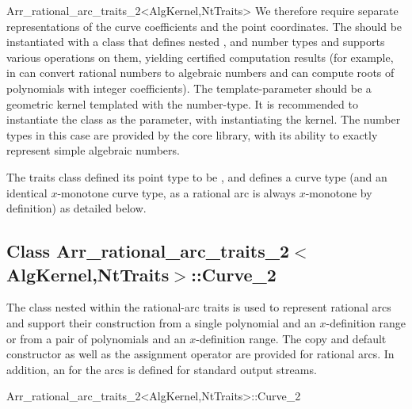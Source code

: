 \begin{ccRefClass}{Arr_rational_arc_traits_2<AlgKernel,NtTraits>}
We therefore require separate representations of the curve coefficients and
the point coordinates. The  should be instantiated with a class
that defines nested ,  and  number
types and supports various operations on them, yielding certified computation
results (for example, in can convert rational numbers to algebraic numbers
and can compute roots of polynomials with integer coefficients).
The  template-parameter should be a geometric kernel templated
with the  number-type. It is recommended to
instantiate the  class as the 
parameter, with  instantiating the kernel.
The number types in this case are provided by the {\sc core} library, with its
ability to exactly represent simple algebraic numbers.

The traits class defined its point type to be ,
and defines a curve type (and an identical $x$-monotone curve type, as 
a rational arc is always $x$-monotone by definition) as detailed below.


\ccIsModel

\subsection*{Class
         Arr\_rational\_arc\_traits\_2$<$AlgKernel,NtTraits$>$::Curve\_2}

The  class nested within the rational-arc traits is used
to represent rational arcs and support their construction from a
single polynomial and an $x$-definition range or from a pair of polynomials
and an $x$-definition range. The copy and default constructor as well as the
assignment operator are provided for rational arcs. In addition, an
 for the arcs is defined for standard output streams.

\begin{ccClass}{Arr_rational_arc_traits_2<AlgKernel,NtTraits>::Curve_2}

\ccTypes



\end{ccClass}
\end{ccRefClass}
